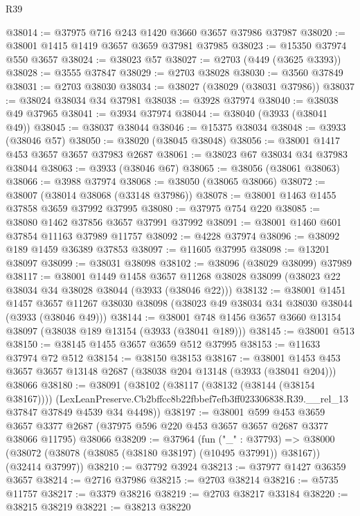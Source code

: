 \begin{lexlean}{R39}
\begin{coremodule}
@38014 := @37975 @716 @243 @1420 @3660 @3657 @37986 @37987
@38020 := @38001 @1415 @1419 @3657 @3659 @37981 @37985
@38023 := @15350 @37974 @550 @3657
@38024 := @38023 @57
@38027 := @2703 (@449 (@3625 @3393))
@38028 := @3555 @37847
@38029 := @2703 @38028
@38030 := @3560 @37849
@38031 := @2703 @38030
@38034 := @38027 (@38029 (@38031 @37986))
@38037 := @38024 @38034 @34 @37981
@38038 := @3928 @37974
@38040 := @38038 @49 @37965
@38041 := @3934 @37974
@38044 := @38040 (@3933 (@38041 @49))
@38045 := @38037 @38044
@38046 := @15375 @38034
@38048 := @3933 (@38046 @57)
@38050 := @38020 (@38045 @38048)
@38056 := @38001 @1417 @453 @3657 @3657 @37983 @2687
@38061 := @38023 @67 @38034 @34 @37983 @38044
@38063 := @3933 (@38046 @67)
@38065 := @38056 (@38061 @38063)
@38066 := @3988 @37974
@38068 := @38050 (@38065 @38066)
@38072 := @38007 (@38014 @38068 (@33148 @37986))
@38078 := @38001 @1463 @1455 @37858 @3659 @37992 @37995
@38080 := @37975 @754 @220
@38085 := @38080 @1462 @37856 @3657 @37991 @37992
@38091 := @38001 @1460 @601 @37854 @11163 @37989 @11757
@38092 := @4228 @37974
@38096 := @38092 @189 @1459 @36389 @37853
@38097 := @11605 @37995
@38098 := @13201 @38097
@38099 := @38031 @38098
@38102 := @38096 (@38029 @38099) @37989
@38117 := @38001
    @1449
    @1458
    @3657
    @11268
    @38028
    @38099
    (@38023 @22 @38034 @34 @38028 @38044 (@3933 (@38046 @22)))
@38132 := @38001
    @1451
    @1457
    @3657
    @11267
    @38030
    @38098
    (@38023 @49 @38034 @34 @38030 @38044 (@3933 (@38046 @49)))
@38144 := @38001 @748 @1456 @3657 @3660 @13154 @38097 (@38038 @189 @13154 (@3933 (@38041 @189)))
@38145 := @38001 @513
@38150 := @38145 @1455 @3657 @3659 @512 @37995
@38153 := @11633 @37974 @72 @512
@38154 := @38150 @38153
@38167 := @38001
    @1453
    @453
    @3657
    @3657
    @13148
    @2687
    (@38038 @204 @13148 (@3933 (@38041 @204)))
    @38066
@38180 := @38091
    (@38102
      (@38117 (@38132 (@38144 (@38154 @38167))))
      (LexLeanPreserve.Cb2bffcc8b22fbbef7efb3ff023306838.R39.__rel_13
        @37847
        @37849
        @4539
        @34
        @4498))
@38197 := @38001
    @599
    @453
    @3659
    @3657
    @3377
    @2687
    (@37975 @596 @220 @453 @3657 @3657 @2687 @3377 @38066 @11795)
    @38066
@38209 := @37964
    (fun ("_" : @37793) =>
    @38000 (@38072 (@38078 (@38085 (@38180 @38197) (@10495 @37991)) @38167)) (@32414 @37997))
@38210 := @37792 @3924
@38213 := @37977 @1427 @36359 @3657
@38214 := @2716 @37986
@38215 := @2703 @38214
@38216 := @5735 @11757
@38217 := @3379 @38216
@38219 := @2703 @38217 @33184
@38220 := @38215 @38219
@38221 := @38213 @38220

\end{coremodule}
\end{lexlean}
